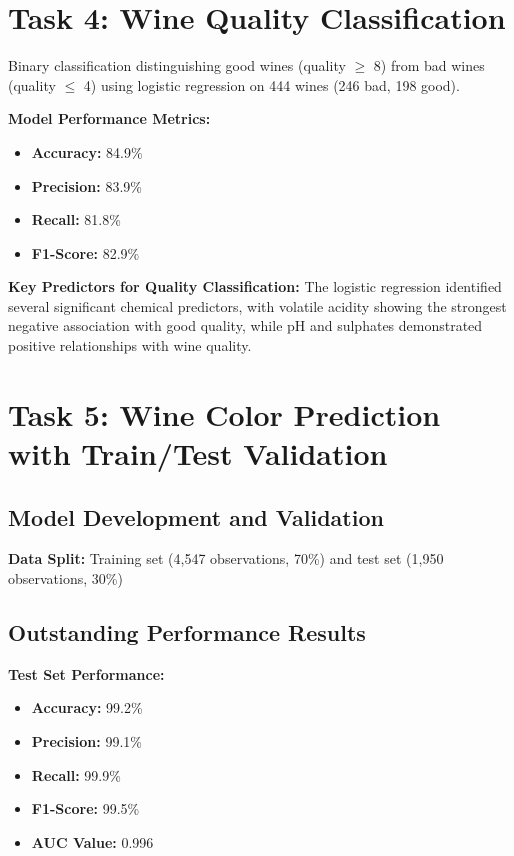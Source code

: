 \section{Task 4: Wine Quality Classification}

Binary classification distinguishing good wines (quality $\geq$ 8) from bad wines (quality $\leq$ 4) using logistic regression on 444 wines (246 bad, 198 good).

\textbf{Model Performance Metrics:}
\begin{itemize}
\item \textbf{Accuracy:} 84.9\%
\item \textbf{Precision:} 83.9\%
\item \textbf{Recall:} 81.8\%
\item \textbf{F1-Score:} 82.9\%
\end{itemize}

\textbf{Key Predictors for Quality Classification:}
The logistic regression identified several significant chemical predictors, with volatile acidity showing the strongest negative association with good quality, while pH and sulphates demonstrated positive relationships with wine quality.

\section{Task 5: Wine Color Prediction with Train/Test Validation}

\subsection{Model Development and Validation}
\textbf{Data Split:} Training set (4,547 observations, 70\%) and test set (1,950 observations, 30\%)

\subsection{Outstanding Performance Results}
\textbf{Test Set Performance:}
\begin{itemize}
\item \textbf{Accuracy:} 99.2\%
\item \textbf{Precision:} 99.1\%
\item \textbf{Recall:} 99.9\%
\item \textbf{F1-Score:} 99.5\%
\item \textbf{AUC Value:} 0.996
\end{itemize}

